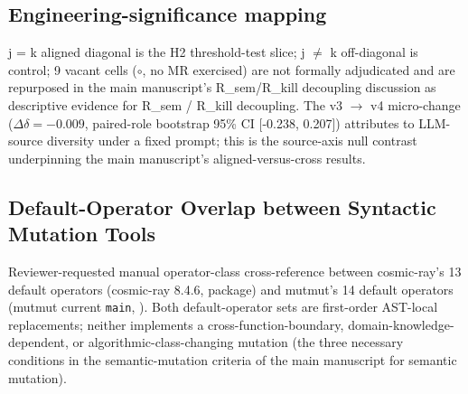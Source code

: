 \documentclass[manuscript,screen,review]{acmart}
\begin{document}
\subsection{Engineering-significance mapping}\label{b.5-engineering-significance-mapping}

j = k aligned diagonal is the H2 threshold-test slice; j $\neq$ k
off-diagonal is control; 9 vacant cells ($\circ$, no MR exercised) are not formally
adjudicated and are repurposed in the main manuscript's R\_sem/R\_kill decoupling discussion as descriptive evidence for
R\_sem / R\_kill decoupling. The v3 $\to$ v4 micro-change
($\Delta\delta = -0.009$, paired-role bootstrap 95\% CI [-0.238, 0.207])
attributes to LLM-source diversity under a fixed prompt; this is the
source-axis null contrast underpinning the main manuscript's aligned-versus-cross results.

\subsection{Default-Operator Overlap between Syntactic Mutation Tools}\label{b.6-mutmut-vs-cosmic-ray-default-operator-overlap}

Reviewer-requested manual operator-class cross-reference between
cosmic-ray's 13 default operators (cosmic-ray 8.4.6,
 package) and mutmut's 14 default
operators (mutmut current \texttt{main},
). Both default-operator sets
are first-order AST-local replacements; neither implements a
cross-function-boundary, domain-knowledge-dependent, or
algorithmic-class-changing mutation (the three necessary conditions in the semantic-mutation criteria of the main manuscript
for semantic mutation).
\end{document}
